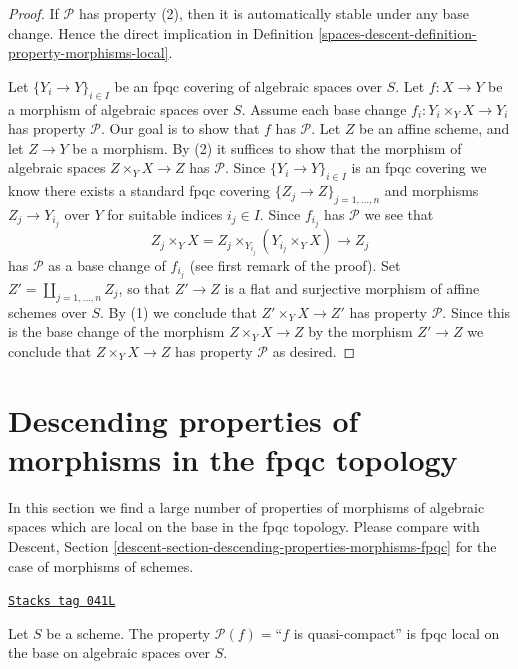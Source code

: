 \begin{proof}
If $\mathcal{P}$ has property (2), then it is automatically
stable under any base change. Hence the direct implication in
Definition \ref{spaces-descent-definition-property-morphisms-local}.

\medskip\noindent
Let $\{Y_i \to Y\}_{i \in I}$ be an fpqc covering of algebraic spaces over $S$.
Let $f : X \to Y$ be a morphism of algebraic spaces over $S$.
Assume each base change $f_i : Y_i \times_Y X \to Y_i$ has property
$\mathcal{P}$. Our goal is to show that $f$ has $\mathcal{P}$.
Let $Z$ be an affine scheme, and let $Z \to Y$ be a morphism.
By (2) it suffices to show that the morphism of algebraic spaces
$Z \times_Y X \to Z$ has $\mathcal{P}$.
Since $\{Y_i \to Y\}_{i \in I}$ is an fpqc covering we know there
exists a standard fpqc covering $\{Z_j \to Z\}_{j = 1, \ldots , n}$
and morphisms $Z_j \to Y_{i_j}$ over $Y$ for suitable indices $i_j \in I$.
Since $f_{i_j}$ has $\mathcal{P}$ we see that
$$
Z_j \times_Y X
=
Z_j \times_{Y_{i_j}} (Y_{i_j} \times_Y X)
\longrightarrow
Z_j
$$
has $\mathcal{P}$ as a base change of $f_{i_j}$ (see first remark of the
proof). Set $Z' = \coprod_{j = 1, \ldots, n} Z_j$, so that $Z' \to Z$ is
a flat and surjective morphism of affine schemes over $S$. By (1)
we conclude that $Z' \times_Y X \to Z'$ has property $\mathcal{P}$.
Since this is the base change of the morphism $Z \times_Y X \to Z$
by the morphism $Z' \to Z$ we conclude that
$Z \times_Y X \to Z$ has property $\mathcal{P}$ as desired.
\end{proof}

\section{Descending properties of morphisms in the fpqc topology}
\label{spaces-descent-section-descending-properties-morphisms-fpqc}
In this section we find a large number of properties
of morphisms of algebraic spaces which are local on the base
in the fpqc topology. Please compare with
Descent, Section \ref{descent-section-descending-properties-morphisms-fpqc}
for the case of morphisms of schemes.

\begin{lemma}
\label{spaces-descent-lemma-descending-property-quasi-compact}
\href{https://stacks.math.columbia.edu/tag/041L}{\texttt{Stacks tag 041L}}

Let $S$ be a scheme.
The property $\mathcal{P}(f) =$``$f$ is quasi-compact''
is fpqc local on the base on algebraic spaces over $S$.
\end{lemma}

